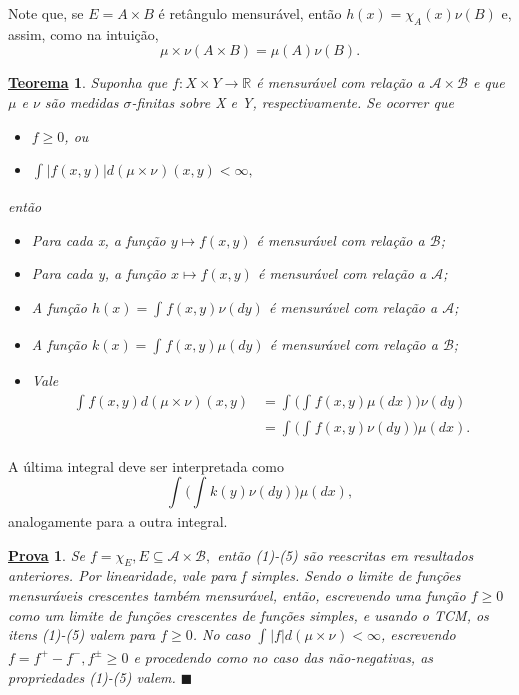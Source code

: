 \documentclass{article}
\newtheorem*{theorem*}{\underline{Teorema}}
\newtheorem*{proof*}{\underline{Prova}}
\renewcommand\qedsymbol{$\blacksquare$}
\begin{document}
  Note que, se \(E = A\times B\) é retângulo mensurável, então \(h(x) = \chi_{A}(x)\nu(B)\) e, assim, como na intuição, 
    \[
      \mu \times \nu(A\times B) = \mu (A) \nu(B).
    \]
    \hypertarget{fubini_tonelli}{
   \begin{theorem*}
     Suponha que \(f:X\times Y\rightarrow \mathbb{R}\) é mensurável com relação a \(\mathcal{A}\times \mathcal{B}\) e que \(\mu \) e \(\nu\) são medidas \(\sigma \)-finitas sobre X e Y, respectivamente. Se ocorrer que 
    \begin{itemize}
      \item[a)] \(f\geq 0\), ou 
        \item[b)] \(\int_{}|f(x, y)| d(\mu\times \nu_{})(x, y) < \infty,\)
    \end{itemize}
    então 
   \begin{itemize}
     \item[1)] Para cada x, a função \(y\mapsto f(x, y)\) é mensurável com relação a \(\mathcal{B}\);
       \item[2)] Para cada y, a função \(x\mapsto f(x, y)\) é mensurável com relação a \(\mathcal{A}\);
         \item[3)] A função \(h(x) = \int_{}f(x, y)\nu( dy)\) é mensurável com relação a \(\mathcal{A}\);
         \item[4)] A função \(k(x) = \int_{}f(x, y)\mu( dy)\) é mensurável com relação a \(\mathcal{B}\);
           \item[5)] Vale 
            \begin{align*}
              \int_{}f(x, y) d(\mu\times \nu)(x, y)_{} &= \int_{}\biggl(\int_{}^{}f(x, y)\mu (dx)\biggr) \nu(dy)\\ 
                                                       &= \int_{}^{}\biggl(\int_{}^{}f(x, y)\nu(dy)\biggr)\mu (dx).
            \end{align*}
   \end{itemize} 
   \end{theorem*}}
  A última integral deve ser interpretada como 
    \[
      \int_{}^{}\biggl(\int_{}^{}k(y)\nu(dy)\biggr)\mu (dx),
  \]
  analogamente para a outra integral. 
 \begin{proof*}
   Se \(f = \chi_{E}, E\subseteq \mathcal{A}\times \mathcal{B},\) então (1)-(5) são reescritas em resultados anteriores. 
Por linearidade, vale para f simples. Sendo o limite de funções mensuráveis crescentes também mensurável, então, escrevendo uma função \(f\geq 0\) como um limite de funções crescentes de funções 
simples, e usando o TCM, os itens (1)-(5) valem para \(f\geq 0\). No caso \(\int_{}|f| d(\mu\times\nu_{}) < \infty\), escrevendo \(f=f^{+}-f^{-}, f^{\pm}\geq 0\) e procedendo como no caso das não-negativas,
as propriedades (1)-(5) valem. \qedsymbol
 \end{proof*}
\end{document}
